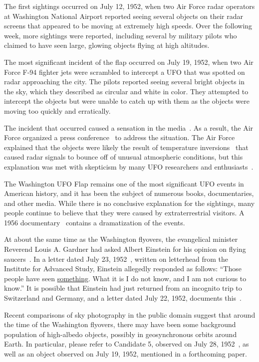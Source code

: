 The first sightings occurred on July 12, 1952, when two Air Force radar operators at Washington National Airport reported seeing several objects on their radar screens that appeared to be moving at extremely high speeds. Over the following week, more sightings were reported, including several by military pilots who claimed to have seen large, glowing objects flying at high altitudes.

The most significant incident of the flap occurred on July 19, 1952, when two Air Force F-94 fighter jets were scrambled to intercept a UFO that was spotted on radar approaching the city. The pilots reported seeing several bright objects in the sky, which they described as circular and white in color. They attempted to intercept the objects but were unable to catch up with them as the objects were moving too quickly and erratically.

The incident that occurred caused a sensation in the media~\cite{Carlson2002Jul}.
As a result, the Air Force organized a press conference~\cite{Samford1952,Archives1952} to address the situation.
The Air Force explained that the objects were likely the result of temperature inversions~\cite{Menzel_1953,BoydMenzel1963Jan}
that caused radar signals to bounce off of unusual atmospheric conditions, but this explanation was met with skepticism by many UFO
researchers and enthusiasts~\cite{Keyhoe1955,Keyhoe1953,Randle2001Oct}.

The Washington UFO Flap remains one of the most significant UFO events in American history, and it has been the subject of numerous books, documentaries, and other media. While there is no conclusive explanation for the sightings, many people continue to believe that they were caused by extraterrestrial visitors.
A 1956 documentary~\cite{UFODOCU1956} contains a dramatization of the events.

At about the same time as the Washington flyovers, the evangelical minister Reverend Louis A. Gardner
had asked Albert Einstein for his opinion on flying saucers~\cite{McCarthy2023Jan}.
In a letter dated July 23, 1952~\cite{EinsteinGardner1952}, written on letterhead from the Institute for Advanced Study, Einstein allegedly responded as follows: ``Those people have seen \underline{something}. What it is I do not know, and I am not curious to know.'' It is possible that Einstein had just returned from an incognito trip to Switzerland and Germany, and a letter dated July 22, 1952, documents this~\cite{Kleinknecht2015}.

Recent comparisons of sky photography in the public domain suggest that around the time of the Washington flyovers,
there may have been some background population of high-albedo objects,
possibly in geosynchronous orbits around Earth.
In particular, please refer to Candidate 5, observed on July 28, 1952~\cite[Figure5 and Table3]{Villarroel2022Apr},
as well as an object observed on July 19, 1952, mentioned in a forthcoming paper.

